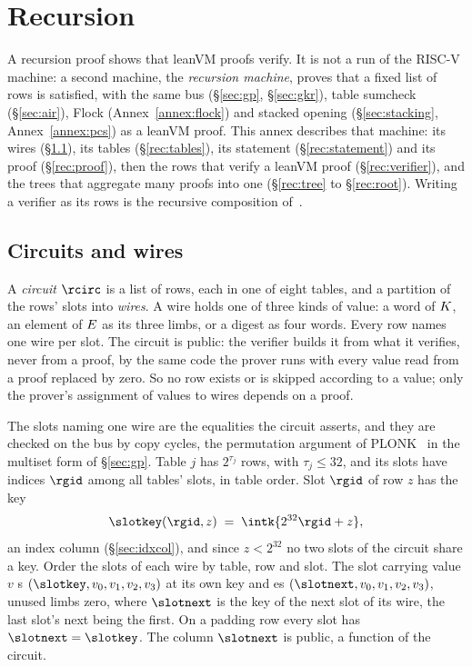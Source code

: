 \section{Recursion}\label{annex:rec}

A recursion proof shows that leanVM proofs verify. It is not a run of the RISC-V machine: a second machine, the \emph{recursion machine}, proves that a fixed list of rows is satisfied, with the same bus (\S\ref{sec:gp}, \S\ref{sec:gkr}), table sumcheck (\S\ref{sec:air}), Flock (Annex~\ref{annex:flock}) and stacked opening (\S\ref{sec:stacking}, Annex~\ref{annex:pcs}) as a leanVM proof. This annex describes that machine: its wires (\S\ref{rec:wires}), its tables (\S\ref{rec:tables}), its statement (\S\ref{rec:statement}) and its proof (\S\ref{rec:proof}), then the rows that verify a leanVM proof (\S\ref{rec:verifier}), and the trees that aggregate many proofs into one (\S\ref{rec:tree} to \S\ref{rec:root}). Writing a verifier as its rows is the recursive composition of~\cite{BCCT13}.

\subsection{Circuits and wires}\label{rec:wires}

A \emph{circuit} $\rcirc$ is a list of rows, each in one of eight tables, and a partition of the rows' slots into \emph{wires}. A wire holds one of three kinds of value: a word of $K$, an element of $E$ as its three limbs, or a digest as four words. Every row names one wire per slot. The circuit is public: the verifier builds it from what it verifies, never from a proof, by the same code the prover runs with every value read from a proof replaced by zero. So no row exists or is skipped according to a value; only the prover's assignment of values to wires depends on a proof.

The slots naming one wire are the equalities the circuit asserts, and they are checked on the bus by copy cycles, the permutation argument of PLONK~\cite{GWC19} in the multiset form of \S\ref{sec:gp}. Table $j$ has $2^{\tau_j}$ rows, with $\tau_j\le32$, and its slots have indices $\rgid$ among all tables' slots, in table order. Slot $\rgid$ of row $z$ has the key
\[
  \slotkey(\rgid,z)\;=\;\intk{2^{32}\rgid+z},
\]
an index column (\S\ref{sec:idxcol}), and since $z<2^{32}$ no two slots of the circuit share a key. Order the slots of each wire by table, row and slot. The slot carrying value $v$ \pull{}s $\tup{\slotkey,v_0,v_1,v_2,v_3}$ at its own key and \push{}es $\tup{\slotnext,v_0,v_1,v_2,v_3}$, unused limbs zero, where $\slotnext$ is the key of the next slot of its wire, the last slot's next being the first. On a padding row every slot has $\slotnext=\slotkey$. The column $\slotnext$ is public, a function of the circuit.

